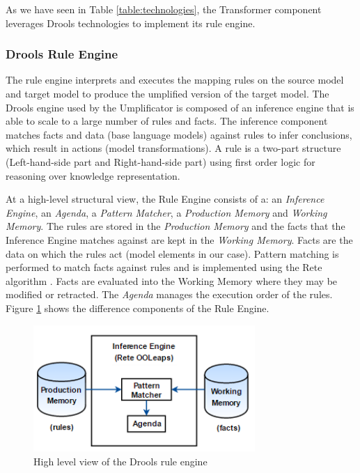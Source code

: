 As we have seen in Table \ref{table:technologies}, the Transformer component leverages Drools technologies to implement its rule engine.

\subsubsection{Drools Rule Engine}

The rule engine interprets and executes the mapping rules on the source model and target model to produce the umplified version of the target model.
The Drools engine used by the Umplificator is composed of an inference engine that is able to scale to a large number of rules and facts.  The inference component matches facts and data (base language models) against rules to infer conclusions, which result in actions (model transformations). A rule is a two-part structure (Left-hand-side part and Right-hand-side part) using first order logic for reasoning over knowledge representation.

At a high-level structural view, the Rule Engine consists of a: an \textit{Inference Engine}, an \textit{Agenda}, a \textit{Pattern Matcher}, a \textit{Production Memory} and \textit{Working Memory}. 
The rules are stored in the \textit{Production Memory} and the facts that the Inference Engine matches against are kept in the \textit{Working Memory}.
Facts are the data on which the rules act (model elements in our case).
Pattern matching is performed to match facts against rules and is implemented using the Rete algorithm \cite{reteDROOLS}. Facts are evaluated into the Working Memory where they may be modified or retracted. The \textit{Agenda} manages the execution order of the rules. Figure \ref{fig:RuleEngineArchitecture} shows the difference components of the Rule Engine.

\begin{figure}[h]
\centering
\includegraphics[width=0.75\textwidth]{Figures/RuleEngineArchitecture.png}
\caption{High level view of the Drools rule engine}
\label{fig:RuleEngineArchitecture}
\end{figure}

